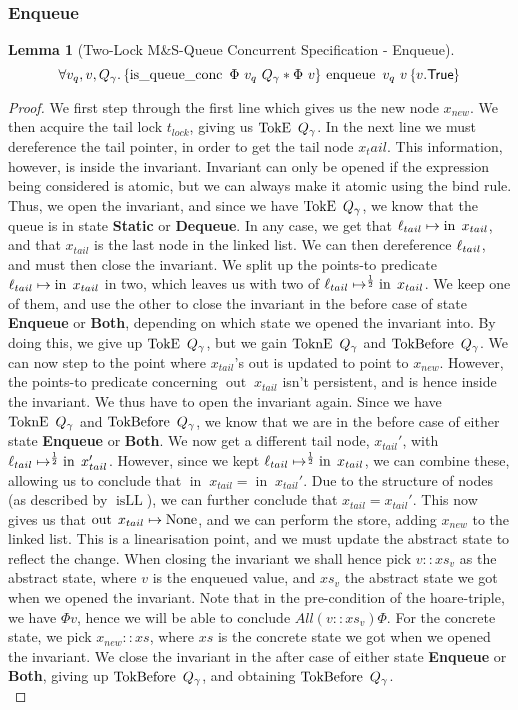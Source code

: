 \documentclass[a4paper, 11pt]{report}
\newtheorem{lemma}[theorem]{Lemma}
\newcommand{\enqueue}{\operatorname{enqueue}}
\newcommand{\isqueueconc}{\operatorname{is\_queue\_conc}}
\newcommand{\isLL}{\operatorname{isLL}}
\newcommand{\nIn}[1]{\operatorname{in} \; #1}
\newcommand{\nOut}[1]{\operatorname{out} \; #1}
\newcommand{\StaticState}{\textbf{Static}}
\newcommand{\EnqueueState}{\textbf{Enqueue}}
\newcommand{\DequeueState}{\textbf{Dequeue}}
\newcommand{\BothState}{\textbf{Both}}
\newcommand{\Qg}{Q_\gname}
\newcommand{\TokE}[1]{\operatorname{TokE}\ #1}
\newcommand{\TokEQg}{\TokE{\Qg}}
\newcommand{\ToknE}[1]{\operatorname{ToknE}\ #1}
\newcommand{\ToknEQg}{\ToknE{\Qg}}
\newcommand{\TokBefore}[1]{\operatorname{TokBefore}\ #1}
\newcommand{\TokBeforeQg}{\TokBefore{\Qg}}
\newcommand{\TokAfterQg}{\TokBefore{\Qg}}
\newcommand{\tlconcspecenq}{\All v_q, v, Q_\gname. \hoare{\isqueueconc \ \Phi \ v_q \ Q_\gname \star \Phi \ v}{\enqueue\ v_q\ v}{v . \TRUE}}
\begin{document}
\subsubsection{Enqueue}
\begin{lemma}[Two-Lock M\&S-Queue Concurrent Specification - Enqueue]\label{TLMSQ:spec:conc:enqueue}
  \begin{equation*}
    \tlconcspecenq
  \end{equation*}
\end{lemma}
\begin{proof}
We first step through the first line which gives us the new node $x_{new}$. We then acquire the tail lock $t_{lock}$, giving us $\TokEQg$. In the next line we must dereference the tail pointer, in order to get the tail node $x_tail$. This information, however, is inside the invariant. Invariant can only be opened if the expression being considered is atomic, but we can always make it atomic using the bind rule. Thus, we open the invariant, and since we have $\TokEQg$, we know that the queue is in state \StaticState{} or \DequeueState{}. In any case, we get that $\loc_{tail} \mapsto \nIn{x_{tail}}$, and that $x_{tail}$ is the last node in the linked list. We can then dereference $\ell_{tail}$, and must then close the invariant. We split up the points-to predicate $\loc_{tail} \mapsto \nIn{x_{tail}}$ in two, which leaves us with two of $\loc_{tail} \mapsto^{\frac{1}{2}} \nIn{x_{tail}}$. We keep one of them, and use the other to close the invariant in the before case of state \EnqueueState{} or \BothState{}, depending on which state we opened the invariant into. By doing this, we give up $\TokEQg$, but we gain $\ToknEQg$ and $\TokAfterQg$. We can now step to the point where $x_{tail}$'s out is updated to point to $x_{new}$. However, the points-to predicate concerning $\nOut{x_{tail}}$ isn't persistent, and is hence inside the invariant. We thus have to open the invariant again. Since we have $\ToknEQg$ and $\TokAfterQg$, we know that we are in the before case of either state \EnqueueState{} or \BothState{}. We now get a different tail node, $x_{tail}'$, with $\loc_{tail} \mapsto^{\frac{1}{2}} \nIn{x_{tail}'}$. However, since we kept $\loc_{tail} \mapsto^{\frac{1}{2}} \nIn{x_{tail}}$, we can combine these, allowing us to conclude that $\nIn{x_{tail}} = \nIn{x_{tail}'}$. Due to the structure of nodes (as described by $\isLL$), we can further conclude that $x_{tail} = x_{tail}'$. This now gives us that $\nOut{x_{tail}} \mapsto \None$, and we can perform the store, adding $x_{new}$ to the linked list. This is a linearisation point, and we must update the abstract state to reflect the change. When closing the invariant we shall hence pick $v :: xs_v$ as the abstract state, where $v$ is the enqueued value, and $xs_v$ the abstract state we got when we opened the invariant. Note that in the pre-condition of the hoare-triple, we have $\Phi v$, hence we will be able to conclude $All (v :: xs_v) \Phi$. For the concrete state, we pick $x_{new} :: xs$, where $xs$ is the concrete state we got when we opened the invariant. We close the invariant in the after case of either state \EnqueueState{} or \BothState{}, giving up $\TokAfterQg$, and obtaining $\TokBeforeQg$.\\

\end{proof}
\end{document}
